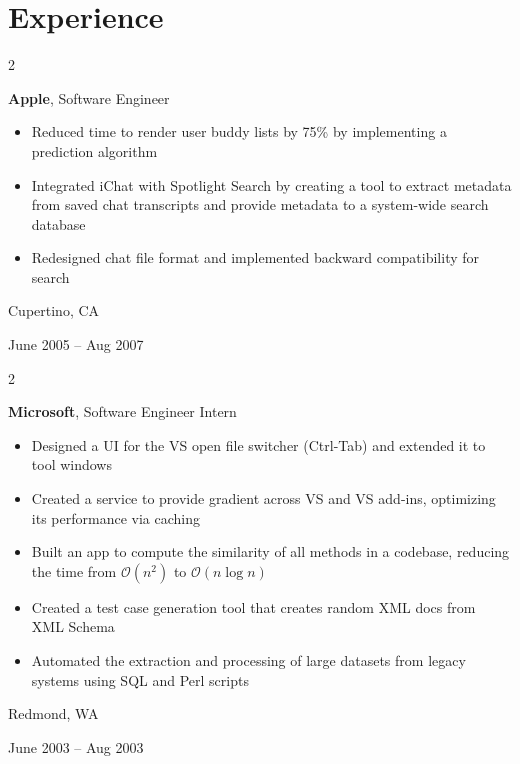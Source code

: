 \documentclass[10pt, letterpaper]{article}
\newenvironment{highlights}{
    \begin{itemize}[
        topsep=0.10 cm,
        parsep=0.10 cm,
        partopsep=0pt,
        itemsep=0pt,
        leftmargin=0.4 cm + 10pt
    ]
}{
    \end{itemize}
} %
\newenvironment{twocolentry}[2][]{
    \onecolentry
    \def\secondColumn{#2}
    \setcolumnwidth{\fill, 4.5 cm}
    \begin{paracol}{2}
}{
    \switchcolumn \raggedleft \secondColumn
    \end{paracol}
    \endonecolentry
} %
\begin{document}
    
    \section{Experience}



        
        \begin{twocolentry}{
            Cupertino, CA

        June 2005 – Aug 2007
        }
            \textbf{Apple}, Software Engineer
            \begin{highlights}
                \item Reduced time to render user buddy lists by 75\% by implementing a prediction algorithm
                \item Integrated iChat with Spotlight Search by creating a tool to extract metadata from saved chat transcripts and provide metadata to a system-wide search database
                \item Redesigned chat file format and implemented backward compatibility for search
            \end{highlights}
        \end{twocolentry}


        \vspace{0.2 cm}

        \begin{twocolentry}{
            Redmond, WA

        June 2003 – Aug 2003
        }
            \textbf{Microsoft}, Software Engineer Intern
            \begin{highlights}
                \item Designed a UI for the VS open file switcher (Ctrl-Tab) and extended it to tool windows
                \item Created a service to provide gradient across VS and VS add-ins, optimizing its performance via caching
                \item Built an app to compute the similarity of all methods in a codebase, reducing the time from $\mathcal{O}(n^2)$ to $\mathcal{O}(n \log n)$
                \item Created a test case generation tool that creates random XML docs from XML Schema
                \item Automated the extraction and processing of large datasets from legacy systems using SQL and Perl scripts
            \end{highlights}
        \end{twocolentry}
\end{document}
